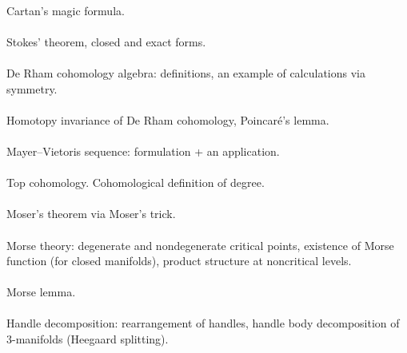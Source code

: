 \documentclass{article}
\begin{document}

\paragraph{} Cartan's magic formula.


\paragraph{} Stokes' theorem, closed and exact forms.


\paragraph{} De Rham cohomology algebra: definitions, an example of calculations via symmetry.


\paragraph{} Homotopy invariance of De Rham cohomology, Poincaré's lemma.


\paragraph{} Mayer--Vietoris sequence: formulation + an application.


\paragraph{}
Top cohomology.
Cohomological definition of degree.


\paragraph{}
Moser's theorem via Moser's trick.


\paragraph{}
Morse theory:
degenerate and nondegenerate critical points,
existence of Morse function (for closed manifolds),
product structure at noncritical levels.


\paragraph{}
Morse lemma.


\paragraph{} Handle decomposition: rearrangement of handles, handle body decomposition of 3-manifolds (Heegaard splitting).

\end{document}
